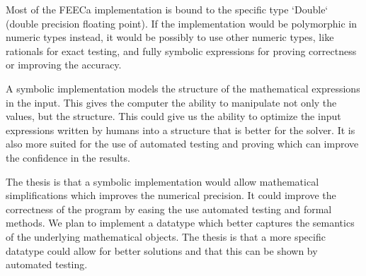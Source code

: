 \documentclass{scrartcl}
\begin{document}

Most of the FEECa implementation is bound to the specific type `Double` (double
precision floating point).  If the implementation would be polymorphic in
numeric types instead, it would be possibly to use other numeric types, like
rationals for exact testing, and fully symbolic expressions for proving
correctness or improving the accuracy.

A symbolic implementation models the structure of the mathematical expressions
in the input.  This gives the computer the ability to manipulate not only the
values, but the structure.  This could give us the ability to optimize the
input expressions written by humans into a structure that is better for the
solver. It is also more suited for the use of automated testing and proving
which can improve the confidence in the results.


The thesis is that a symbolic implementation would allow mathematical
simplifications which improves the numerical precision. It could improve the
correctness of the program by easing the use automated testing and formal
methods.  We plan to implement a datatype which better captures the semantics
of the underlying mathematical objects.  The thesis is that a more specific
datatype could allow for better solutions and that this can be shown by
automated testing.





\end{document}
